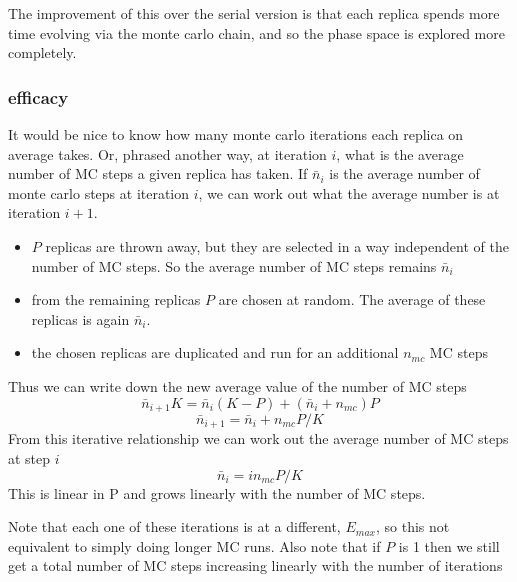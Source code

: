 \documentclass[a4paper]{article}
\begin{document}
The improvement of this over the serial version is that each replica spends more time 
evolving via the monte carlo chain, and so the phase space is explored more completely.

\subsubsection{efficacy}

It would be nice to know how many monte carlo iterations each replica on
average takes.  Or, phrased another way, at iteration $i$, what is the average
number of MC steps a given replica has taken. If $\bar{n}_i$ is the average number
of monte carlo steps at iteration $i$, we can work out what the average number is
at iteration $i+1$.  

\begin{itemize}
  \item $P$ replicas are thrown away, but they are selected in a way independent of the
    number of MC steps.  So the average number of MC steps remains $\bar{n}_i$
    
  \item from the remaining replicas $P$ are chosen at random.  The average of these
    replicas is again $\bar{n}_i$.

  \item the chosen replicas are duplicated and run for an additional $n_{mc}$ MC steps
\end{itemize}

Thus we can write down the new average value of the number of MC steps
\begin{equation}
  \bar{n}_{i+1} K = \bar{n}_i  (K - P) + (\bar{n}_i + n_{mc}) P
\end{equation}
\begin{equation}
  \bar{n}_{i+1} = \bar{n}_i  +  n_{mc} P / K
  \label{eqn:par_iter}
\end{equation}
From this iterative relationship we can work out the average number of
MC steps at step $i$
\begin{equation}
  \bar{n}_{i} = i n_{mc} P / K
\end{equation}
This is linear in P and grows linearly with the number of MC steps.

Note that each one of these iterations is at a different, $E_{max}$, so this
not equivalent to simply doing longer MC runs. Also note that if $P$ is 1 then
we still get a total number of MC steps increasing linearly with the number of
iterations
\end{document}
